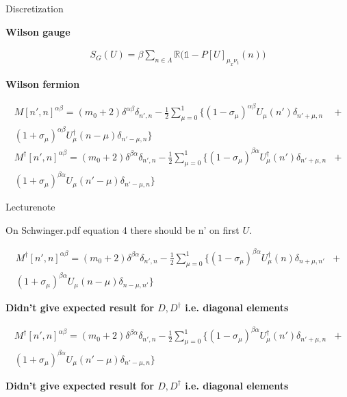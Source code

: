 \documentclass[10pt]{beamer}
\begin{document}
 \begin{frame}{Discretization}
     \begin{center} \textbf{Wilson gauge}\end{center}
     \begin{align}
        S_G(U) = \beta\sum\limits_{n\in\Lambda}\mathbb{R}\big(\mathbb{1} - P[U]_{\mu_x\nu_t}(n)\big)
    \end{align}
     \begin{center} \textbf{Wilson fermion}\end{center}
     \begin{align}
        M[n',n]^{\alpha\beta} = (m_0+2)\delta^{\alpha\beta}\delta_{n',n} -\frac{1}{2}\sum\limits_{\mu=0}^{1}\{(1-\sigma_\mu)^{\alpha\beta}U_{\mu}(n')\delta_{n'+\mu,n} &+ \nonumber\\
        (1+\sigma_\mu)^{\alpha\beta}U^{\dagger}_{\mu}(n-\mu)\delta_{n'-\mu,n}  \}\\
        M^{\dagger}[n',n]^{\alpha\beta} = (m_0+2)\delta^{\beta\alpha}\delta_{n',n} -\frac{1}{2}\sum\limits_{\mu=0}^{1}\{(1-\sigma_\mu)^{\beta\alpha}U^{\dagger}_{\mu}(n')\delta_{n'+\mu,n} &+  \nonumber \\
        (1+\sigma_\mu)^{\beta\alpha}U_{\mu}(n'-\mu)\delta_{n'-\mu,n}  \}
    \end{align}

 \end{frame}

 \begin{frame} {Lecturenote}
     \begin{center}
        On Schwinger.pdf equation 4 there should be n' on first $U$.
    \end{center}
    \begin{align}
        M^{\dagger}[n',n]^{\alpha\beta} = (m_0+2)\delta^{\beta\alpha}\delta_{n',n} -\frac{1}{2}\sum\limits_{\mu=0}^{1}\{(1-\sigma_\mu)^{\beta\alpha}U^{\dagger}_{\mu}(n)\delta_{n+\mu,n'} &+  \nonumber \\
        (1+\sigma_\mu)^{\beta\alpha}U_{\mu}(n-\mu)\delta_{n-\mu,n'}  \}\end{align}
     \begin{center}
            \textbf{Didn't give expected result for $D,D^{\dagger}$ i.e. diagonal elements}\end{center}
    \begin{align}
        M^{\dagger}[n',n]^{\alpha\beta} = (m_0+2)\delta^{\beta\alpha}\delta_{n',n} -\frac{1}{2}\sum\limits_{\mu=0}^{1}\{(1-\sigma_\mu)^{\beta\alpha}U^{\dagger}_{\mu}(n')\delta_{n'+\mu,n} &+  \nonumber \\
        (1+\sigma_\mu)^{\beta\alpha}U_{\mu}(n'-\mu)\delta_{n'-\mu,n}  \} 
    \end{align}\begin{center}
        \textbf{Didn't give expected result for $D,D^{\dagger}$ i.e. diagonal elements}\end{center}
    
    
 \end{frame}
\end{document}
